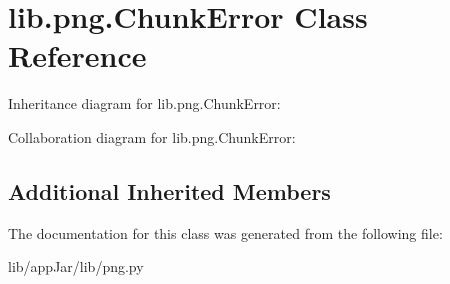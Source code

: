 \hypertarget{classlib_1_1png_1_1_chunk_error}{}\section{lib.\+png.\+Chunk\+Error Class Reference}
\label{classlib_1_1png_1_1_chunk_error}


Inheritance diagram for lib.\+png.\+Chunk\+Error\+:


Collaboration diagram for lib.\+png.\+Chunk\+Error\+:
\subsection*{Additional Inherited Members}


The documentation for this class was generated from the following file\+:\begin{DoxyCompactItemize}
\item 
lib/app\+Jar/lib/png.\+py\end{DoxyCompactItemize}

